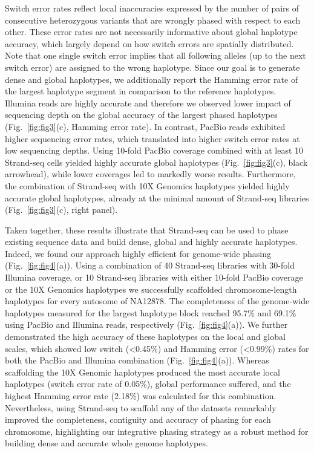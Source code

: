     Switch error rates reflect local inaccuracies expressed by the number of pairs of consecutive heterozygous variants that are wrongly phased with respect to each other. 
    These error rates are not necessarily informative about global haplotype accuracy, which largely depend on how switch errors are spatially distributed. 
    Note that one single switch error implies that all following alleles (up to the next switch error) are assigned to the wrong haplotype. 
    Since our goal is to generate dense and global haplotypes, we additionally report the Hamming error rate of the largest haplotype segment in comparison to the reference haplotypes. 
    Illumina reads are highly accurate and therefore we observed lower impact of sequencing depth on the global accuracy of the largest phased haplotypes (Fig.~\ref{fig:fig3}(c), Hamming error rate). 
    In contrast, PacBio reads exhibited higher sequencing error rates, which translated into higher switch error rates at low sequencing depths. 
    Using 10-fold PacBio coverage combined with at least 10 Strand-seq cells yielded highly accurate global haplotypes (Fig.~\ref{fig:fig3}(c), black arrowhead), 
    while lower coverages led to markedly worse results. Furthermore, the combination of Strand-seq with 10X Genomics haplotypes yielded highly accurate global haplotypes, 
    already at the minimal amount of Strand-seq libraries (Fig.~\ref{fig:fig3}(c), right panel).
    
    Taken together, these results illustrate that Strand-seq can be used to phase existing sequence data and build dense, global and highly accurate haplotypes. 
    Indeed, we found our approach highly efficient for genome-wide phasing (Fig.~\ref{fig:fig4}(a)). Using a combination of 40 Strand-seq libraries with 30-fold Illumina coverage, 
    or 10 Strand-seq libraries with either 10-fold PacBio coverage or the 10X Genomics haplotypes we successfully scaffolded chromosome-length haplotypes for every autosome of NA12878. 
    The completeness of the genome-wide haplotypes measured for the largest haplotype block reached 95.7\% and 69.1\% using PacBio and Illumina reads, respectively (Fig.~\ref{fig:fig4}(a)). 
    We further demonstrated the high accuracy of these haplotypes on the local and global scales, which showed low switch (<0.45\%) and Hamming error (<0.99\%) rates for both the PacBio and Illumina combination (Fig.~\ref{fig:fig4}(a)). 
    Whereas scaffolding the 10X Genomic haplotypes produced the most accurate local haplotypes (switch error rate of 0.05\%), global performance suffered, and the highest Hamming error rate (2.18\%) was calculated for this combination. 
    Nevertheless, using Strand-seq to scaffold any of the datasets remarkably improved the completeness, contiguity and accuracy of phasing for each chromosome, 
    highlighting our integrative phasing strategy as a robust method for building dense and accurate whole genome haplotypes.

